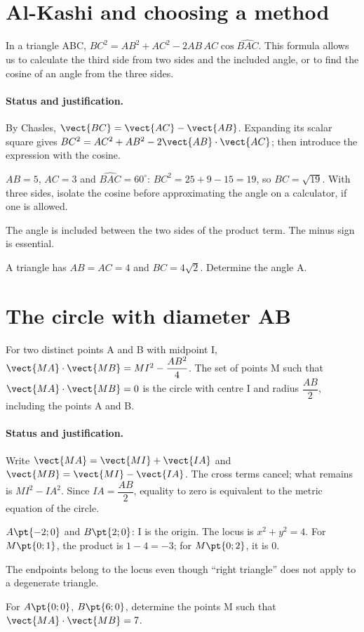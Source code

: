 \section{Al-Kashi and choosing a method}\label{C03-U4}
\begin{keypoint}
In a triangle ABC, $BC^2=AB^2+AC^2-2AB\,AC\cos\widehat{BAC}$. This formula allows us to calculate the third side from two sides and the included angle, or to find the cosine of an angle from the three sides.
\end{keypoint}
\paragraph{Status and justification.} By Chasles, $\vect{BC}=\vect{AC}-\vect{AB}$. Expanding its scalar square gives $BC^2=AC^2+AB^2-2\vect{AB}\cdot\vect{AC}$; then introduce the expression with the cosine.
\begin{example}$AB=5$, $AC=3$ and $\widehat{BAC}=60^\circ$: $BC^2=25+9-15=19$, so $BC=\sqrt{19}$. With three sides, isolate the cosine before approximating the angle on a calculator, if one is allowed.\end{example}\label{C03-EX4}
\begin{pitfall}The angle is included between the two sides of the product term. The minus sign is essential.\end{pitfall}
\begin{application}A triangle has $AB=AC=4$ and $BC=4\sqrt2$. Determine the angle A.\end{application}\label{C03-AP4}
\section{The circle with diameter AB}\label{C03-U5}
\begin{keypoint}
For two distinct points A and B with midpoint I, $\vect {MA}\cdot \vect {MB}=MI^2-\dfrac{AB^2}{4}$. The set of points M such that $\vect{MA}\cdot\vect{MB}=0$ is the circle with centre I and radius $\dfrac{AB}{2}$, including the points A and B.
\end{keypoint}
\paragraph{Status and justification.} Write $\vect{MA}=\vect{MI}+\vect{IA}$ and $\vect{MB}=\vect{MI}-\vect{IA}$. The cross terms cancel; what remains is $MI^2-IA^2$. Since $IA=\dfrac{AB}{2}$, equality to zero is equivalent to the metric equation of the circle.
\begin{example}$A\pt{-2;0}$ and $B\pt{2;0}$: I is the origin. The locus is $x^2+y^2=4$. For $M\pt{0;1}$, the product is $1-4=-3$; for $M\pt{0;2}$, it is 0.\end{example}\label{C03-EX5}
\begin{pitfall}The endpoints belong to the locus even though ``right triangle'' does not apply to a degenerate triangle.\end{pitfall}
\begin{application}For $A\pt{0;0}$, $B\pt{6;0}$, determine the points M such that $\vect{MA}\cdot\vect{MB}=7$.\end{application}\label{C03-AP5}
\mxnewpage
